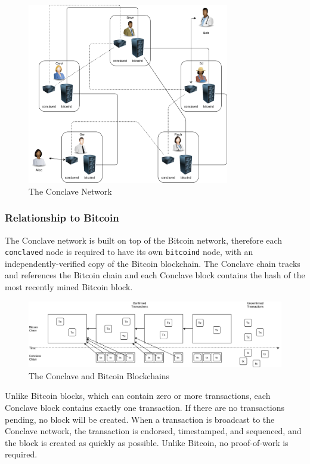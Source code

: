 \documentclass{report}
\begin{document}
		
		\begin{figure}[H]
			\begin{center}
				\includegraphics[width=250pt]{img/ConclaveNetwork.png}
			\end{center}
			\caption{The Conclave Network}
			\label{fig:conclaveNetwork}
		\end{figure}
		
		
		\subsubsection{Relationship to Bitcoin}
		The Conclave network is built on top of the Bitcoin network, therefore each \texttt{conclaved} node is required to have its own \texttt{bitcoind} node, with an independently-verified copy of the Bitcoin blockchain. The Conclave chain tracks and references the Bitcoin chain and each Conclave block contains the hash of the most recently mined Bitcoin block. \\

		
		\begin{figure}[H]
			\begin{center}
				\includegraphics[width=400pt]{img/2Blockchains.png}
			\end{center}
			\caption{The Conclave and Bitcoin Blockchains}
			\label{fig:conclaveAndBitcoin}
		\end{figure}
		
		Unlike Bitcoin blocks, which can contain zero or more transactions, each Conclave block contains exactly one transaction. If there are no transactions pending, no block will be created. When a transaction is broadcast to the Conclave network, the transaction is endorsed, timestamped, and sequenced, and the block is created as quickly as possible. Unlike Bitcoin, no proof-of-work is required.
\end{document}
